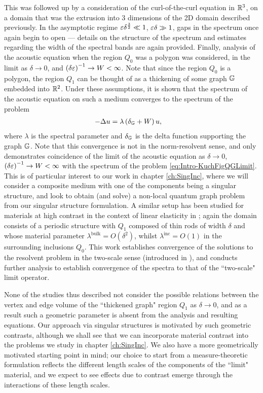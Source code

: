 This was followed up \cite{figotin1996band-maxwell} by a consideration of the curl-of-the-curl equation in $\mathbb{R}^3$, on a domain that was the extrusion into 3 dimensions of the 2D domain described previously.
In the asymptotic regime $\varepsilon\delta^{\frac{3}{2}}\ll 1$, $\varepsilon\delta\gg1$, gaps in the spectrum once again begin to open --- details on the structure of the spectrum and estimates regarding the width of the spectral bands are again provided.
Finally, analysis of the acoustic equation when the region $Q_0$ was a polygon \cite{figotin1998spectral} was considered, in the limit as $\delta\rightarrow0$, and $\left( \delta\varepsilon \right)^{-1}\rightarrow W<\infty$.
Note that since the region $Q_0$ is a polygon, the region $Q_1$ can be thought of as a thickening of some graph $\mathbb{G}$ embedded into $\mathbb{R}^2$.
Under these assumptions, it is shown that the spectrum of the acoustic equation on such a medium converges to the spectrum of the problem
\begin{align} \label{eq:Intro-KuchFigQGLimit}
	-\Delta u &= \lambda\left( \delta_{\mathbb{G}} + W \right)u,
\end{align}
where $\lambda$ is the spectral parameter and $\delta_{\mathbb{G}}$ is the delta function supporting the graph $\mathbb{G}$.
Note that this convergence is not in the norm-resolvent sense, and only demonstrates coincidence of the limit of the acoustic equation as $\delta\rightarrow0$, $\left( \delta\varepsilon \right)^{-1}\rightarrow W<\infty$ with the spectrum of the problem \eqref{eq:Intro-KuchFigQGLimit}.
This is of particular interest to our work in chapter \ref{ch:SingInc}, where we will consider a composite medium with one of the components being a singular structure, and look to obtain (and solve) a non-local quantum graph problem from our singular structure formulation.
A similar setup has been studied for materials at high contrast in the context of linear elasticity in \cite{cherednichenko2019homogenisation}; again the domain consists of a periodic structure with $Q_1$ composed of thin rods of width $\delta$ and whose material parameter $\lambda^{\mathrm{bulk}}=O(\delta^2)$, whilst $\lambda^{\mathrm{inc}}=O(1)$ in the surrounding inclusions $Q_0$.
This work establishes convergence of the solutions to the resolvent problem in the two-scale sense (introduced in \cite{zhikov2000extension}), and conducts further analysis to establish convergence of the spectra to that of the ``two-scale" limit operator.

None of the studies thus described not consider the possible relations between the vertex and edge volume of the ``thickened graph" region $Q_1$ as $\delta\rightarrow0$, and as a result such a geometric parameter is absent from the analysis and resulting equations.
Our approach via singular structures is motivated by such geometric contrasts, although we shall see that we can incorporate material contrast into the problems we study in chapter \ref{ch:SingInc}.
We also have a more geometrically motivated starting point in mind; our choice to start from a measure-theoretic formulation reflects the different length scales of the components of the ``limit" material, and we expect to see effects due to contrast emerge through the interactions of these length scales.